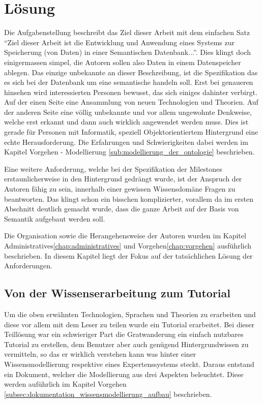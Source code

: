 \chapter{Lösung}
\label{chap:loesung}
Die Aufgabenstellung beschreibt das Ziel dieser Arbeit mit dem einfachen Satz "`Ziel dieser Arbeit ist die Entwicklung und Anwendung eines Systems zur Speicherung (von Daten) in einer Semantischen Datenbank..."'.  Dies klingt doch einigermassen simpel, die Autoren sollen also Daten in einem Datenspeicher ablegen. Das einzige unbekannte an dieser Beschreibung, ist die Spezifikation das es sich bei der Datenbank um eine semantische handeln soll. Erst bei genaueren hinsehen wird interessierten Personen bewusst, das sich einiges dahinter verbirgt. Auf der einen Seite eine Ansammlung von neuen Technologien und Theorien. Auf der anderen Seite eine völlig unbekannte und vor allem ungewohnte Denkweise, welche erst erkannt und dann auch wirklich angewendet werden muss. Dies ist gerade für Personen mit Informatik, speziell Objektorientiertem Hintergrund eine echte Herausforderung. Die Erfahrungen und Schwierigkeiten dabei werden im Kapitel Vorgehen - Modellierung \ref{sub:modellierung_der_ontologie} beschrieben.

Eine weitere Anforderung, welche bei der Spezifikation der Milestones erstaunlicherweise in den Hintergrund gedrängt wurde, ist der Anspruch der Autoren fähig zu sein, innerhalb einer gewissen Wissensdomäne Fragen zu beantworten. Das klingt schon ein bisschen komplizierter, vorallem da im ersten Abschnitt deutlich gemacht wurde, dass die ganze Arbeit auf der Basis von Semantik aufgebaut werden soll. 

Die Organisation sowie die Herangehensweise der Autoren wurden im Kapitel Administratives\ref{chap:administratives} und Vorgehen\ref{chap:vorgehen} ausführlich beschrieben. In diesem Kapitel liegt der Fokus auf der tatsächlichen Lösung der Anforderungen.


\section{Von der Wissenserarbeitung zum Tutorial}
\label{sec:loesung_tutorial}
Um die oben erwähnten Technologien, Sprachen und Theorien zu erarbeiten und diese vor allem mit dem Leser zu teilen wurde ein Tutorial erarbeitet. Bei dieser Teillösung war ein schwieriger Part die Gratwanderung ein einfach nutzbares Tutorial zu erstellen, dem Benutzer aber auch genügend Hintergrundwissen zu vermitteln, so das er wirklich verstehen kann was hinter einer Wissensmodellierung respektive eines Expertenssystems steckt. Daraus entstand ein Dokument, welcher die Modellierung aus drei Aspekten beleuchtet. Diese werden auführlich im Kapitel Vorgehen \ref{subsec:dokumentation_wissensmodellierung_aufbau} beschrieben.

